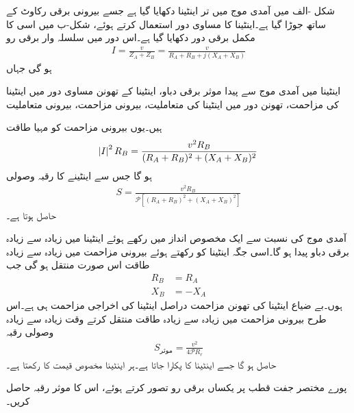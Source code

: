 شکل -الف میں آمدی موج میں تر اینٹینا دکھایا گیا ہے جسے بیرونی برقی رکاوٹ  کے ساتھ جوڑا گیا ہے۔اینٹینا کا  مساوی دور استعمال کرتے ہوئے،  شکل-ب میں اسی کا  مکمل برقی دور دکھایا گیا ہے۔اس دور میں سلسلہ وار برقی رو
\begin{align*}
I=\frac{v}{Z_A+Z_B}=\frac{v}{R_A+R_B+j(X_A+X_B)}
\end{align*}
ہو گی جہاں
\begin{description}
 اینٹینا میں آمدی موج سے پیدا موثر برقی دباو،
 اینٹینا کے تھونن مساوی دور میں اینٹینا کی مزاحمت،
 تھونن دور میں اینٹینا کی متعاملیت،
 بیرونی مزاحمت،
 بیرونی متعاملیت
\end{description}
ہیں۔یوں بیرونی مزاحمت کو مہیا طاقت 
\begin{align}
\abs{I}^2 R_B=\frac{v^2 R_B}{(R_A+R_B)^2+(X_A+X_B)^2}
\end{align}
ہو گا جس سے  اینٹینے کا رقبہ وصولی
\begin{align}
S=\frac{v^2 R_B}{\mathscr{P}\left[(R_A+R_B)^2+(X_A+X_B)^2\right]}
\end{align}
حاصل ہوتا ہے۔ 

آمدی موج کی نسبت سے ایک مخصوص انداز میں رکھے ہوئے اینٹینا میں زیادہ سے زیادہ برقی دباو پیدا ہو گا۔اسی جگہ اینٹینا کو رکھتے ہوئے بیرونی مزاحمت میں زیادہ سے زیادہ طاقت اس صورت منتقل ہو گی جب
\begin{align}
R_B&=R_A\\
X_B&=-X_A
\end{align}
ہوں۔بے ضیاع اینٹینا کی تھونن مزاحمت دراصل اینٹینا کی اخراجی مزاحمت  ہی ہے۔اس طرح بیرونی مزاحمت میں زیادہ سے زیادہ طاقت منتقل کرتے وقت زیادہ سے زیادہ وصولی رقبہ
\begin{align}\label{مساوات_اینٹینا_موثر_رقبہ_اینٹینا}
S_{\text{موثر}} = \frac{v^2}{4\mathscr{P} R_r }
\end{align}
 حاصل ہو گا جسے اینٹینا کا   پکارا جاتا ہے۔ہر اینٹینا مخصوص قیمت کا  رکھتا ہے۔

پورے مختصر جفت قطب پر یکساں برقی رو تصور کرتے ہوئے، اس کا موثر رقبہ حاصل کریں۔

